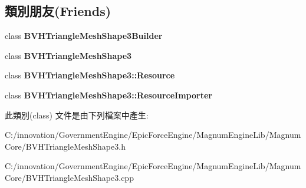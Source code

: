 \subsection*{類別朋友(Friends)}
\begin{DoxyCompactItemize}
\item 
class {\bfseries B\+V\+H\+Triangle\+Mesh\+Shape3\+Builder}\hypertarget{class_i_dream_sky_1_1_b_v_h_triangle_mesh_shape3_1_1_data_a0f649365ade947ac32bf9c7a71b53fef}{}\label{class_i_dream_sky_1_1_b_v_h_triangle_mesh_shape3_1_1_data_a0f649365ade947ac32bf9c7a71b53fef}

\item 
class {\bfseries B\+V\+H\+Triangle\+Mesh\+Shape3}\hypertarget{class_i_dream_sky_1_1_b_v_h_triangle_mesh_shape3_1_1_data_a7d93684b283f743d08e2f2bd03a8bbec}{}\label{class_i_dream_sky_1_1_b_v_h_triangle_mesh_shape3_1_1_data_a7d93684b283f743d08e2f2bd03a8bbec}

\item 
class {\bfseries B\+V\+H\+Triangle\+Mesh\+Shape3\+::\+Resource}\hypertarget{class_i_dream_sky_1_1_b_v_h_triangle_mesh_shape3_1_1_data_ac4877a9b420bd82dfa94ecb349aaf30c}{}\label{class_i_dream_sky_1_1_b_v_h_triangle_mesh_shape3_1_1_data_ac4877a9b420bd82dfa94ecb349aaf30c}

\item 
class {\bfseries B\+V\+H\+Triangle\+Mesh\+Shape3\+::\+Resource\+Importer}\hypertarget{class_i_dream_sky_1_1_b_v_h_triangle_mesh_shape3_1_1_data_a4cabc043c009b59e57956377e8726767}{}\label{class_i_dream_sky_1_1_b_v_h_triangle_mesh_shape3_1_1_data_a4cabc043c009b59e57956377e8726767}

\end{DoxyCompactItemize}


此類別(class) 文件是由下列檔案中產生\+:\begin{DoxyCompactItemize}
\item 
C\+:/innovation/\+Government\+Engine/\+Epic\+Force\+Engine/\+Magnum\+Engine\+Lib/\+Magnum\+Core/B\+V\+H\+Triangle\+Mesh\+Shape3.\+h\item 
C\+:/innovation/\+Government\+Engine/\+Epic\+Force\+Engine/\+Magnum\+Engine\+Lib/\+Magnum\+Core/B\+V\+H\+Triangle\+Mesh\+Shape3.\+cpp\end{DoxyCompactItemize}
